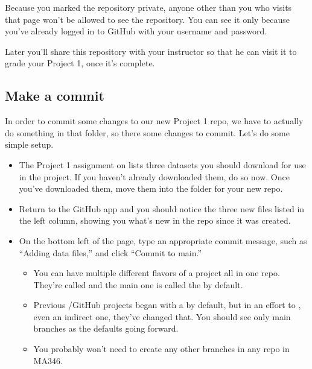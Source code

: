 \documentclass[letterpaper,10pt,english]{jupyterBook}
\begin{document}
\sphinxAtStartPar
Because you marked the repository private, anyone other than you who visits that page won’t be allowed to see the repository.  You can see it only because you’ve already logged in to GitHub with your username and password.

\sphinxAtStartPar
Later you’ll share this repository with your instructor so that he can visit it to grade your Project 1, once it’s complete.


\subsection{Make a commit}
\label{\detokenize{chapter-8-version-control:make-a-commit}}
\sphinxAtStartPar
In order to commit some changes to our new Project 1 repo, we have to actually do something in that folder, so there  some changes to commit.  Let’s do some simple setup.
\begin{itemize}
\item {} 
\sphinxAtStartPar
The Project 1 assignment on  lists three datasets you should download for use in the project.  If you haven’t already downloaded them, do so now.  Once you’ve downloaded them, move them into the folder for your new repo.

\item {} 
\sphinxAtStartPar
Return to the GitHub app and you should notice the three new files listed in the left column, showing you what’s new in the repo since it was created.

\item {} 
\sphinxAtStartPar
On the bottom left of the page, type an appropriate commit message, such as “Adding data files,” and click “Commit to main.”
\begin{itemize}
\item {} 
\sphinxAtStartPar
You can have multiple different flavors of a project all in one repo.  They’re called  and the main one is called the  by default.

\item {} 
\sphinxAtStartPar
Previous /GitHub projects began with a  by default, but in an effort to , even an indirect one, they’ve changed that.  You should see only main branches as the defaults going forward.

\item {} 
\sphinxAtStartPar
You probably won’t need to create any other branches in any repo in MA346.

\end{itemize}

\end{itemize}
\end{document}
